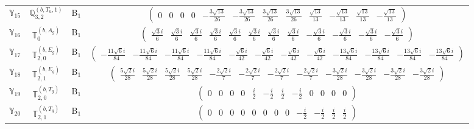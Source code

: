 \documentclass[fleqn,10pt,landscape]{article}
\begin{document}
\begin{itemize}
\begin{center}
\begin{longtable}{c|c|c|c}
$ \mathbb{Y}_{15} $ & $\mathbb{Q}_{3,2}^{(b,T_{u},1)}$ & B$_{1}$ & $\begin{pmatrix} 0 & 0 & 0 & 0 & - \frac{3 \sqrt{13}}{26} & - \frac{3 \sqrt{13}}{26} & \frac{3 \sqrt{13}}{26} & \frac{3 \sqrt{13}}{26} & \frac{\sqrt{13}}{13} & - \frac{\sqrt{13}}{13} & \frac{\sqrt{13}}{13} & - \frac{\sqrt{13}}{13} \end{pmatrix}$ \\
$ \mathbb{Y}_{16} $ & $\mathbb{T}_{0}^{(b,A_{g})}$ & B$_{1}$ & $\begin{pmatrix} \frac{\sqrt{3} i}{6} & \frac{\sqrt{3} i}{6} & \frac{\sqrt{3} i}{6} & \frac{\sqrt{3} i}{6} & \frac{\sqrt{3} i}{6} & \frac{\sqrt{3} i}{6} & \frac{\sqrt{3} i}{6} & \frac{\sqrt{3} i}{6} & - \frac{\sqrt{3} i}{6} & - \frac{\sqrt{3} i}{6} & - \frac{\sqrt{3} i}{6} & - \frac{\sqrt{3} i}{6} \end{pmatrix}$ \\
$ \mathbb{Y}_{17} $ & $\mathbb{T}_{2,0}^{(b,E_{g})}$ & B$_{1}$ & $\begin{pmatrix} - \frac{11 \sqrt{6} i}{84} & - \frac{11 \sqrt{6} i}{84} & - \frac{11 \sqrt{6} i}{84} & - \frac{11 \sqrt{6} i}{84} & - \frac{\sqrt{6} i}{42} & - \frac{\sqrt{6} i}{42} & - \frac{\sqrt{6} i}{42} & - \frac{\sqrt{6} i}{42} & - \frac{13 \sqrt{6} i}{84} & - \frac{13 \sqrt{6} i}{84} & - \frac{13 \sqrt{6} i}{84} & - \frac{13 \sqrt{6} i}{84} \end{pmatrix}$ \\
$ \mathbb{Y}_{18} $ & $\mathbb{T}_{2,1}^{(b,E_{g})}$ & B$_{1}$ & $\begin{pmatrix} \frac{5 \sqrt{2} i}{28} & \frac{5 \sqrt{2} i}{28} & \frac{5 \sqrt{2} i}{28} & \frac{5 \sqrt{2} i}{28} & - \frac{2 \sqrt{2} i}{7} & - \frac{2 \sqrt{2} i}{7} & - \frac{2 \sqrt{2} i}{7} & - \frac{2 \sqrt{2} i}{7} & - \frac{3 \sqrt{2} i}{28} & - \frac{3 \sqrt{2} i}{28} & - \frac{3 \sqrt{2} i}{28} & - \frac{3 \sqrt{2} i}{28} \end{pmatrix}$ \\
$ \mathbb{Y}_{19} $ & $\mathbb{T}_{2,0}^{(b,T_{g})}$ & B$_{1}$ & $\begin{pmatrix} 0 & 0 & 0 & 0 & \frac{i}{2} & - \frac{i}{2} & \frac{i}{2} & - \frac{i}{2} & 0 & 0 & 0 & 0 \end{pmatrix}$ \\
$ \mathbb{Y}_{20} $ & $\mathbb{T}_{2,1}^{(b,T_{g})}$ & B$_{1}$ & $\begin{pmatrix} 0 & 0 & 0 & 0 & 0 & 0 & 0 & 0 & - \frac{i}{2} & - \frac{i}{2} & \frac{i}{2} & \frac{i}{2} \end{pmatrix}$ \\

\end{longtable}
\end{center}
\end{itemize}
\end{document}
